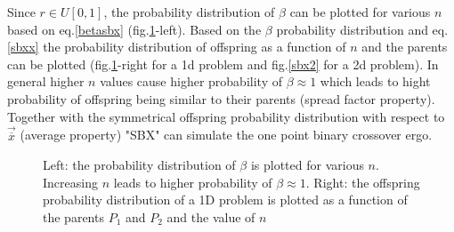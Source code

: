 \begin{itemize}
Since $r\in U[0,1]$, the probability distribution of $\beta$ can be plotted for various $n$ based on eq.\ref{betasbx} (fig.\ref{sbx}-left). Based on the $\beta$ probability distribution and eq.\ref{sbxx} the probability distribution of offspring as a function of $n$ and the parents can be plotted (fig.\ref{sbx}-right for a 1d problem and fig.\ref{sbx2} for a 2d problem). In general higher $n$ values cause higher probability of $\beta \approx 1$ which leads to hight probability of offspring being similar to their parents (spread factor property). Together with the symmetrical offspring probability distribution with respect to $\vec{\overline{x}}$ (average property) "SBX" can simulate the one point binary crossover ergo.    

\begin{figure}[h!]
\begin{minipage}[b]{0.5\linewidth}
 \centering
\end{minipage}
\begin{minipage}[b]{0.5\linewidth}
 \centering
\end{minipage}
\caption{Left: the probability distribution of $\beta$ is plotted for various $n$. Increasing $n$ leads to higher probability of $\beta \approx 1$. Right: the offspring probability distribution of a 1D problem is plotted as a function of the parents $P_1$ and $P_2$ and the value of $n$ }
\label{sbx}
\end{figure}


\end{itemize}
